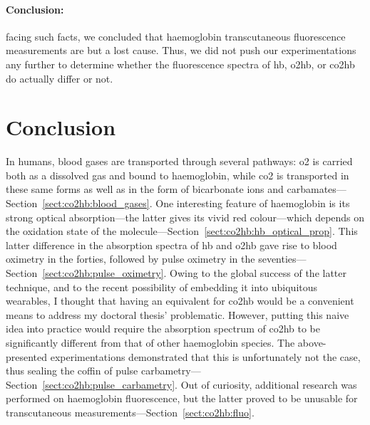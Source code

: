 \paragraph{Conclusion:} facing such facts, we concluded that haemoglobin transcutaneous fluorescence measurements are but a lost cause. Thus, we did not push our experimentations any further to determine whether the fluorescence spectra of \gls{hb}, \gls{o2hb}, or \gls{co2hb} do actually differ or not.

\section{Conclusion}\label{sect:co2hb:conclusion}

In humans, blood gases are transported through several pathways: \gls{o2} is carried both as a dissolved gas and bound to haemoglobin, while \gls{co2} is transported in these same forms as well as in the form of bicarbonate ions and carbamates---Section~\ref{sect:co2hb:blood_gases}. One interesting feature of haemoglobin is its strong optical absorption---the latter gives \myblood{} its vivid red colour---which depends on the oxidation state of the molecule---Section~\ref{sect:co2hb:hb_optical_prop}. This latter difference in the absorption spectra of \gls{hb} and \gls{o2hb} gave rise to blood oximetry in the forties, followed by pulse oximetry in the seventies---Section~\ref{sect:co2hb:pulse_oximetry}. Owing to the global success of the latter technique, and to the recent possibility of embedding it into ubiquitous wearables, I thought that having an equivalent for \gls{co2hb} would be a convenient means to address my doctoral thesis' problematic. However, putting this naive idea into practice would require the absorption spectrum of \gls{co2hb} to be significantly different from that of other haemoglobin species. The above-presented experimentations demonstrated that this is unfortunately not the case, thus sealing the coffin of pulse carbametry---Section~\ref{sect:co2hb:pulse_carbametry}. Out of curiosity, additional research was performed on haemoglobin fluorescence, but the latter proved to be unusable for \invivo{} transcutaneous measurements---Section~\ref{sect:co2hb:fluo}.


